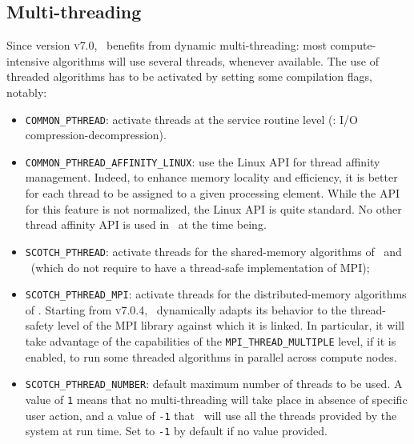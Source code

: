 \begin{center}
\end{center}

\subsection{Multi-threading}

Since version \textsc{v7.0}, \scotch\ benefits from dynamic
multi-threading: most compute-intensive algorithms will use several
threads, whenever available. The use of threaded algorithms has to be
activated by setting some compilation flags, notably:
\begin{itemize}
\item
\texttt{COMMON\_PTHREAD}: activate threads at the service routine
level (\eg: I/O compression-decompression).
\item
\texttt{COMMON\_\lbt PTHREAD\_\lbt AFFINITY\_\lbt LINUX}: use
the Linux API for thread affinity management. Indeed, to enhance
memory locality and efficiency, it is better for each thread to be
assigned to a given processing element. While the API for this feature
is not normalized, the Linux API is quite standard. No other thread
affinity API is used in \scotch\ at the time being.
\item
\texttt{SCOTCH\_PTHREAD}: activate threads for the shared-memory
algorithms of \scotch\ and \ptscotch\ (which do not require to have
a thread-safe implementation of MPI);
\item
\texttt{SCOTCH\_PTHREAD\_MPI}: activate threads for the
distributed-memory algorithms of \ptscotch. Starting from
\textsc{v7.0.4}, \ptscotch\ dynamically adapts its behavior to the
thread-safety level of the MPI library against which it is linked. In
particular, it will take advantage of the capabilities of the
\texttt{MPI\_\lbt THREAD\_\lbt MULTIPLE} level, if it is enabled, to
run some threaded algorithms in parallel across compute nodes.
\item
\texttt{SCOTCH\_PTHREAD\_NUMBER}: default maximum number of threads to
be used. A value of \texttt{1} means that no multi-threading will take
place in absence of specific user action, and a value of \texttt{-1}
that \scotch\ will use all the threads provided by the system at run
time. Set to \texttt{-1} by default if no value provided.
\end{itemize}

